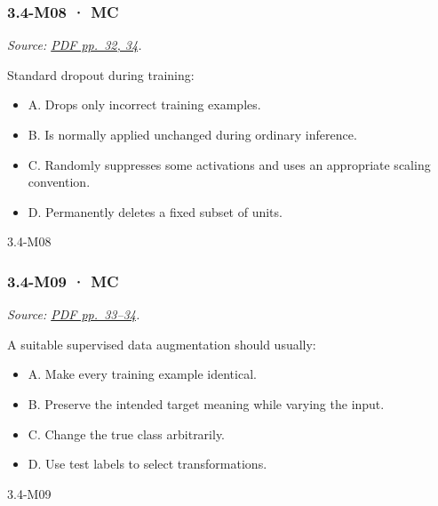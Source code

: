 \noindent\begin{minipage}{\linewidth}

\subsubsection{3.4-M08 · MC}\label{m08-mc-10}

\emph{Source:
\href{../Lecture\%20Slides/3.4.\%20Deep\%20Learning\%20Fundamentals\%20II.pdf\#page=32}{PDF
pp.~32, 34}.}

Standard dropout during training:

\begin{itemize}
\tightlist
\item
  A. Drops only incorrect training examples.
\item
  B. Is normally applied unchanged during ordinary inference.
\item
  C. Randomly suppresses some activations and uses an appropriate
  scaling convention.
\item
  D. Permanently deletes a fixed subset of units.
\end{itemize}

\begin{solution}[8mm]{3.4-M08}

\end{solution}
\end{minipage}\par\medskip

\noindent\begin{minipage}{\linewidth}

\subsubsection{3.4-M09 · MC}\label{m09-mc-10}

\emph{Source:
\href{../Lecture\%20Slides/3.4.\%20Deep\%20Learning\%20Fundamentals\%20II.pdf\#page=33}{PDF
pp.~33--34}.}

A suitable supervised data augmentation should usually:

\begin{itemize}
\tightlist
\item
  A. Make every training example identical.
\item
  B. Preserve the intended target meaning while varying the input.
\item
  C. Change the true class arbitrarily.
\item
  D. Use test labels to select transformations.
\end{itemize}

\begin{solution}[8mm]{3.4-M09}

\end{solution}
\end{minipage}\par\medskip

